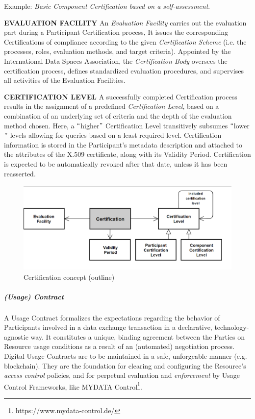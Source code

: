 Example: \textit{Basic Component Certification based on a self-assessment}.

\textbf{EVALUATION FACILITY }An \textit{Evaluation Facility} carries out the evaluation part during a Participant Certification process, It issues the corresponding Certifications of compliance according to the given \textit{Certification Scheme} (i.e. the processes, roles, evaluation methods, and target criteria). Appointed by the International Data Spaces Association, the \textit{Certification Body }oversees the certification process, defines standardized evaluation procedures, and supervises all activities of the Evaluation Facilities. 

\textbf{CERTIFICATION LEVEL} A successfully completed Certification process results in the assignment of a predefined \textit{Certification Level}, based on a combination of an underlying set of criteria and the depth of the evaluation method chosen. Here, a $``$higher$"$  Certification Level transitively subsumes $``$lower$"$  levels allowing for queries based on a least required level. Certification information is stored in the Participant’s metadata description and attached to the attributes of the X.509 certificate, along with its Validity Period. Certification is expected to be automatically revoked after that date, unless it has been reasserted. 




\begin{figure}[H]
	\begin{Center}
		\includegraphics[width=4.5in,height=1.81in]{./media/image51.png}
		\caption{Certification concept (outline)}
		\label{fig:Certification_concept_outline}
	\end{Center}
\end{figure}



\subparagraph*{(Usage) Contract}
A Usage Contract formalizes the expectations regarding the behavior of Participants involved in a data exchange transaction in a declarative, technology-agnostic way. It constitutes a unique, binding agreement between the Parties on Resource usage conditions as a result of an (automated) negotiation process. Digital Usage Contracts are to be maintained in a safe, unforgeable manner (e.g. blockchain). They are the foundation for clearing and configuring the Resource’s \textit{access control} policies, and for perpetual evaluation and \textit{enforcement }by Usage Control Frameworks, like MYDATA Control\footnote{https://www.mydata-control.de/ }. 

